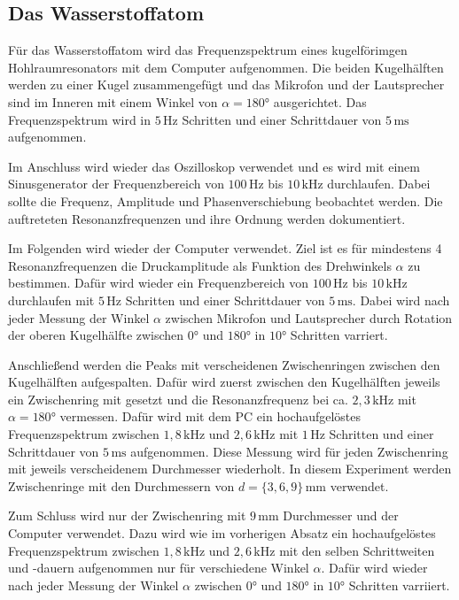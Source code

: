 \subsection{Das Wasserstoffatom}
\label{sec:d_H}

Für das Wasserstoffatom wird das Frequenzspektrum eines kugelförimgen Hohlraumresonators mit dem Computer aufgenommen. Die beiden Kugelhälften werden zu einer Kugel zusammengefügt und das Mikrofon und der Lautsprecher sind im Inneren mit einem Winkel von $\alpha = 180°$ ausgerichtet. Das Frequenzspektrum wird in $5 \, \mathrm{Hz}$ Schritten und einer Schrittdauer von $5 \, \mathrm{ms}$ aufgenommen. \newline

Im Anschluss wird wieder das Oszilloskop verwendet und es wird mit einem Sinusgenerator der Frequenzbereich von $100 \, \mathrm{Hz}$ bis $10 \, \mathrm{kHz}$ durchlaufen. Dabei sollte die Frequenz, Amplitude und Phasenverschiebung beobachtet werden. Die auftreteten Resonanzfrequenzen und ihre Ordnung werden dokumentiert. \newline

Im Folgenden wird wieder der Computer verwendet. Ziel ist es für mindestens 4 Resonanzfrequenzen die Druckamplitude als Funktion des Drehwinkels $\alpha$ zu bestimmen. Dafür wird wieder ein Frequenzbereich von $100 \, \mathrm{Hz}$ bis $10 \, \mathrm{kHz}$ durchlaufen mit $5 \, \mathrm{Hz}$ Schritten und einer Schrittdauer von $5 \, \mathrm{ms}$. Dabei wird nach jeder Messung der Winkel $\alpha$ zwischen Mikrofon und Lautsprecher durch Rotation der oberen Kugelhälfte zwischen $0°$ und $180°$ in $10°$ Schritten varriert. \newline

Anschließend werden die Peaks mit verscheidenen Zwischenringen zwischen den Kugelhälften aufgespalten. Dafür wird zuerst zwischen den Kugelhälften jeweils ein Zwischenring mit gesetzt und die Resonanzfrequenz bei ca. $2, \! 3 \, \mathrm{kHz}$ mit $\alpha = 180°$ vermessen. Dafür wird mit dem PC ein hochaufgelöstes Frequenzspektrum zwischen $1, \! 8 \, \mathrm{kHz}$ und $2, \! 6 \, \mathrm{kHz}$ mit $1 \, \mathrm{Hz}$ Schritten und einer Schrittdauer von $5 \, \mathrm{ms}$ aufgenommen. Diese Messung wird für jeden Zwischenring mit jeweils verscheidenem Durchmesser wiederholt. In diesem Experiment werden Zwischenringe mit den Durchmessern von $d = \{ 3, 6, 9 \} \, \mathrm{mm}$ verwendet. \newline

Zum Schluss wird nur der Zwischenring mit $9 \, \mathrm{mm}$ Durchmesser und der Computer verwendet. Dazu wird wie im vorherigen Absatz ein hochaufgelöstes Frequenzspektrum zwischen $1, \! 8 \, \mathrm{kHz}$ und $2, \! 6 \, \mathrm{kHz}$ mit den selben Schrittweiten und -dauern aufgenommen nur für verschiedene Winkel $\alpha$. Dafür wird wieder nach jeder Messung der Winkel $\alpha$ zwischen $0°$ und $180°$ in $10°$ Schritten varriiert.

